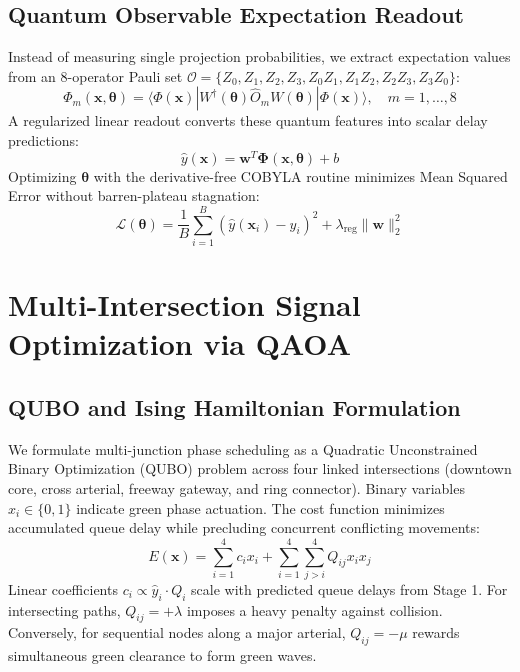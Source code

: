 \documentclass[conference]{IEEEtran}
\begin{document}
\subsection{Quantum Observable Expectation Readout}
Instead of measuring single projection probabilities, we extract expectation values from an 8-operator Pauli set $\mathcal{O} = \{Z_0, Z_1, Z_2, Z_3, Z_0 Z_1, Z_1 Z_2, Z_2 Z_3, Z_3 Z_0\}$:
\begin{equation}
    \Phi_m(\mathbf{x}, \bm{\theta}) = \langle \Phi(\mathbf{x}) | W^\dagger(\bm{\theta}) \hat{O}_m W(\bm{\theta}) | \Phi(\mathbf{x}) \rangle, \quad m=1,\dots,8
\end{equation}
A regularized linear readout converts these quantum features into scalar delay predictions:
\begin{equation}
    \hat{y}(\mathbf{x}) = \mathbf{w}^T \bm{\Phi}(\mathbf{x}, \bm{\theta}) + b
\end{equation}
Optimizing $\bm{\theta}$ with the derivative-free COBYLA routine minimizes Mean Squared Error without barren-plateau stagnation:
\begin{equation}
    \mathcal{L}(\bm{\theta}) = \frac{1}{B} \sum_{i=1}^B \left( \hat{y}(\mathbf{x}_i) - y_i \right)^2 + \lambda_{\text{reg}} \|\mathbf{w}\|_2^2
\end{equation}

\section{Multi-Intersection Signal Optimization via QAOA}

\subsection{QUBO and Ising Hamiltonian Formulation}
We formulate multi-junction phase scheduling as a Quadratic Unconstrained Binary Optimization (QUBO) problem across four linked intersections (downtown core, cross arterial, freeway gateway, and ring connector). Binary variables $x_i \in \{0, 1\}$ indicate green phase actuation. The cost function minimizes accumulated queue delay while precluding concurrent conflicting movements:
\begin{equation}
    E(\mathbf{x}) = \sum_{i=1}^4 c_i x_i + \sum_{i=1}^4 \sum_{j > i}^4 Q_{ij} x_i x_j
\end{equation}
Linear coefficients $c_i \propto \hat{y}_i \cdot Q_i$ scale with predicted queue delays from Stage 1. For intersecting paths, $Q_{ij} = +\lambda$ imposes a heavy penalty against collision. Conversely, for sequential nodes along a major arterial, $Q_{ij} = -\mu$ rewards simultaneous green clearance to form green waves.
\end{document}
